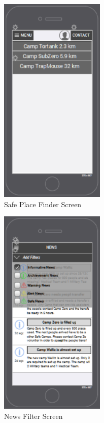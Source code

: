 \begin{figure}[htbp]
\begin{center}
 \caption{\label{fig:A8} Safe Place Finder Screen}
   \includegraphics[width=50mm]{./images/App/placefinder.eps}
\end{center}
\end{figure} 
\begin{figure}[htbp]
\begin{center}
 \caption{\label{fig:A9}  News Filter Screen}
   \includegraphics[width=50mm]{./images/App/newsfilter.eps}
\end{center}
\end{figure} 
